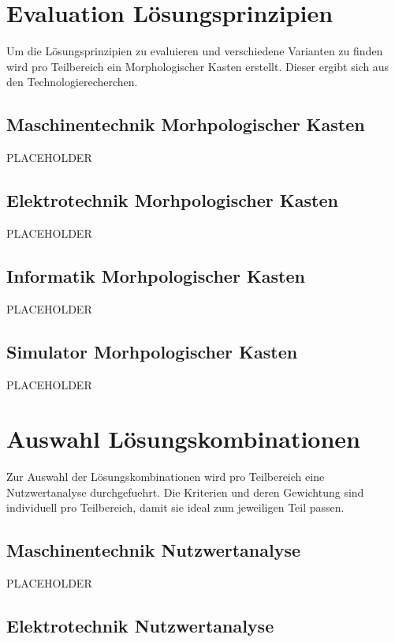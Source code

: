 \section{Evaluation Lösungsprinzipien}

Um die Lösungsprinzipien zu evaluieren und verschiedene Varianten zu finden wird pro Teilbereich ein Morphologischer Kasten erstellt. Dieser ergibt sich aus den Technologierecherchen.

\subsection{Maschinentechnik Morhpologischer Kasten}

PLACEHOLDER

\subsection{Elektrotechnik Morhpologischer Kasten}

PLACEHOLDER

\subsection{Informatik Morhpologischer Kasten}

PLACEHOLDER

\subsection{Simulator Morhpologischer Kasten}

PLACEHOLDER


\newpage
\section{Auswahl Lösungskombinationen}

Zur Auswahl der Lösungskombinationen wird pro Teilbereich eine Nutzwertanalyse durchgefuehrt. Die Kriterien und deren Gewichtung sind individuell pro Teilbereich, damit sie ideal zum jeweiligen Teil passen.

\subsection{Maschinentechnik Nutzwertanalyse}

PLACEHOLDER

\subsection{Elektrotechnik Nutzwertanalyse}

